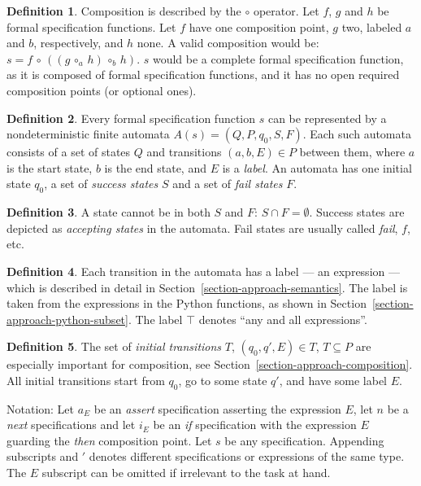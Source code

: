 \documentclass[a4paper,11pt]{kth-mag}
\theoremstyle{definition}
\newtheorem{mydef}{Definition}
\begin{document}
\begin{mydef}\label{def-}
Composition is described by the $\circ$ operator. Let $f$, $g$ and $h$ be
formal specification functions. Let $f$ have one composition point, $g$ two,
labeled $a$ and $b$, respectively, and $h$ none. A valid composition would be:
$s = f \, \circ \, ((g \, \circ_{a} \, h) \, \circ_{b} \, h)$.  $s$ would be a
complete formal specification function, as it is composed of formal
specification functions, and it has no open required composition points (or
optional ones).
\end{mydef}

\begin{mydef}\label{def-}
Every formal specification function $s$ can be represented by a
nondeterministic finite automata $A(s) = (Q, P, q_0, S, F)$. Each such automata
consists of a set of states $Q$ and transitions $(a, b, E) \in P$ between them,
where $a$ is the start state, $b$ is the end state, and $E$ is a
\textit{label}. An automata has one initial state $q_0$, a set of
\textit{success states} $S$ and a set of \textit{fail states} $F$.
\end{mydef}

\begin{mydef}\label{def-}
A state cannot be in both $S$ and $F$: $S \cap F = \emptyset$. Success states
are depicted as \textit{accepting states} in the automata. Fail states are
usually called \textit{fail}, $f$, etc.
\end{mydef}

\begin{mydef}\label{def-}
Each transition in the automata has a label --- an expression --- which is
described in detail in Section~\ref{section-approach-semantics}. The label is
taken from the expressions in the Python functions, as shown in
Section~\ref{section-approach-python-subset}. The label $\top$ denotes ``any
and all expressions''.
\end{mydef}

\begin{mydef}\label{def-}
The set of \textit{initial transitions} $T$, $(q_0, q', E) \in T$, $T \subseteq
P$ are especially important for composition, see
Section~\ref{section-approach-composition}. All initial transitions start from
$q_0$, go to some state $q'$, and have some label $E$.
\end{mydef}

Notation: Let $a_E$ be an \textit{assert} specification asserting the
expression $E$, let $n$ be a \textit{next} specifications and let $i_E$ be an
\textit{if} specification with the expression $E$ guarding the \textit{then}
composition point. Let $s$ be any specification. Appending subscripts and $'$
denotes different specifications or expressions of the same type. The $E$
subscript can be omitted if irrelevant to the task at hand.
\end{document}
